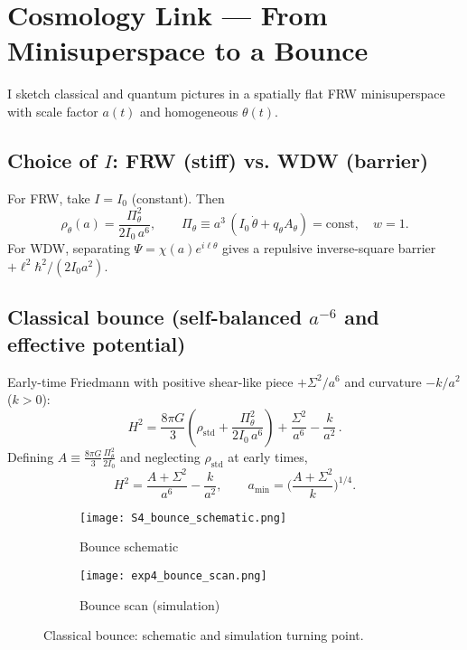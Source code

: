 \section{Cosmology Link --- From Minisuperspace to a Bounce}\label{sec:cosmology}

I sketch classical and quantum pictures in a spatially flat FRW minisuperspace with scale factor $a(t)$ and homogeneous $\theta(t)$.

\subsection{Choice of \texorpdfstring{$I$}{I}: FRW (stiff) vs. WDW (barrier)}\label{sec:i-of-a}
For FRW, take $I=I_0$ (constant). Then
\begin{equation}
\rho_\theta(a) = \frac{\Pi_\theta^2}{2 I_0\,a^6},\qquad \Pi_\theta\equiv a^3\,(I_0\,\dot\theta+q_\theta A_\theta)=\text{const},\quad w=1.
\end{equation}
For WDW, separating $\Psi=\chi(a)e^{i\ell\theta}$ gives a repulsive inverse-square barrier $+\ell^2\hbar^2/(2 I_0 a^2)$.

\subsection{Classical bounce (self-balanced \texorpdfstring{$a^{-6}$}{a-6} and effective potential)}\label{sec:classical-bounce}
Early-time Friedmann with positive shear-like piece $+\Sigma^2/a^6$ and curvature $-k/a^2$ ($k>0$):
\begin{equation}
 H^2 = \frac{8\pi G}{3}\left(\rho_{\mathrm{std}} + \frac{\Pi_\theta^2}{2 I_0\,a^6}\right) + \frac{\Sigma^2}{a^6} - \frac{k}{a^2} \, .
\end{equation}
Defining $A\equiv \tfrac{8\pi G}{3}\tfrac{\Pi_\theta^2}{2I_0}$ and neglecting $\rho_{\mathrm{std}}$ at early times,
\begin{equation}
 H^2=\frac{A+\Sigma^2}{a^6} - \frac{k}{a^2},\qquad a_{\min}=\Big(\frac{A+\Sigma^2}{k}\Big)^{\!1/4} .
\end{equation}

\begin{figure}[htbp]
  \centering
  \begin{subfigure}[b]{0.48\linewidth}
    \centering
  \texttt{[image: S4\_bounce\_schematic.png]}
    \caption{Bounce schematic}
    \label{fig:bounce-schematic}
  \end{subfigure}\hfill
  \begin{subfigure}[b]{0.48\linewidth}
    \centering
  \texttt{[image: exp4\_bounce\_scan.png]}
    \caption{Bounce scan (simulation)}
    \label{fig:bounce-scan}
  \end{subfigure}
  \caption{Classical bounce: schematic and simulation turning point.}
  \label{fig:bounce}
\end{figure}

